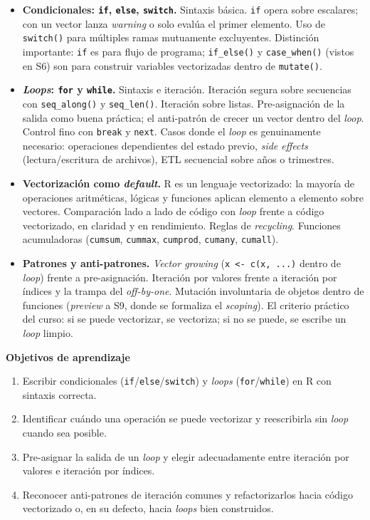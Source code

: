 \documentclass[11pt,letterpaper]{article}
\newcommand{\blue}[1]{{\color{cerulean}#1}}
\newcommand{\orange}[1]{{\color{redorange}#1}}
\begin{document}
\begin{itemize}[leftmargin=*, itemsep=2pt]
    \item \textbf{Condicionales: \texttt{if}, \texttt{else}, \texttt{switch}.} Sintaxis básica. \texttt{if} opera sobre escalares; con un vector lanza \textit{warning} o solo evalúa el primer elemento. Uso de \texttt{switch()} para múltiples ramas mutuamente excluyentes. Distinción importante: \texttt{if} es para flujo de programa; \texttt{if\_else()} y \texttt{case\_when()} (vistos en S6) son para construir variables vectorizadas dentro de \texttt{mutate()}.
    \item \textbf{\textit{Loops}: \texttt{for} y \texttt{while}.} Sintaxis e iteración. Iteración segura sobre secuencias con \texttt{seq\_along()} y \texttt{seq\_len()}. Iteración sobre listas. \blue{Pre-asignación} de la salida como buena práctica; el anti-patrón de crecer un vector dentro del \textit{loop}. Control fino con \texttt{break} y \texttt{next}. Casos donde el \textit{loop} es genuinamente necesario: operaciones dependientes del estado previo, \textit{side effects} (lectura/escritura de archivos), ETL secuencial sobre años o trimestres.
    \item \textbf{Vectorización como \textit{default}.} R es un lenguaje vectorizado: la mayoría de operaciones aritméticas, lógicas y funciones aplican elemento a elemento sobre vectores. Comparación lado a lado de código con \textit{loop} frente a código vectorizado, en claridad y en rendimiento. Reglas de \textit{recycling}. Funciones acumuladoras (\texttt{cumsum}, \texttt{cummax}, \texttt{cumprod}, \texttt{cumany}, \texttt{cumall}).
    \item \textbf{Patrones y anti-patrones.} \textit{Vector growing} (\texttt{x <- c(x, ...)} dentro de \textit{loop}) frente a pre-asignación. Iteración por valores frente a iteración por índices y la trampa del \textit{off-by-one}. Mutación involuntaria de objetos dentro de funciones (\textit{preview} a S9, donde se formaliza el \textit{scoping}). El criterio práctico del curso: \orange{si se puede vectorizar, se vectoriza; si no se puede, se escribe un \textit{loop} limpio}.
\end{itemize}

\medskip
\noindent\textbf{Objetivos de aprendizaje}
\begin{enumerate}[leftmargin=*, itemsep=1pt]
    \item Escribir condicionales (\texttt{if}/\texttt{else}/\texttt{switch}) y \textit{loops} (\texttt{for}/\texttt{while}) en R con sintaxis correcta.
    \item Identificar cuándo una operación se puede vectorizar y reescribirla sin \textit{loop} cuando sea posible.
    \item Pre-asignar la salida de un \textit{loop} y elegir adecuadamente entre iteración por valores e iteración por índices.
    \item Reconocer anti-patrones de iteración comunes y refactorizarlos hacia código vectorizado o, en su defecto, hacia \textit{loops} bien construidos.
\end{enumerate}
\end{document}
